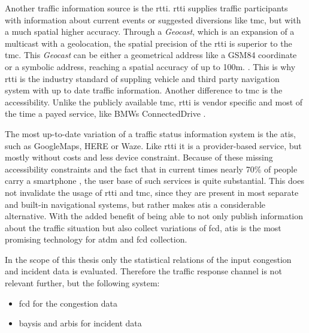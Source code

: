 Another traffic information source is the \acrshort{rtti}. \acrshort{rtti} supplies traffic participants with information about current events or suggested diversions like \acrfull{tmc}, but with a much spatial higher accuracy. Through a \textit{Geocast}, which is an expansion of a multicast with a geolocation, the spatial precision of the \acrshort{rtti} is superior to the \acrshort{tmc}. This \textit{Geocast} can be either a geometrical address like a GSM84 coordinate or a symbolic address, reaching a spatial accuracy of up to 100m.  \parencite{LAPID2020,HindenDeering2006,ImielinskiNavas1996}. This is why \acrshort{rtti} is the industry standard of suppling vehicle and third party navigation system with up to date traffic information. Another difference to \acrshort{tmc} is the accessibility. Unlike the publicly available \acrshort{tmc}, \acrshort{rtti} is vendor specific and most of the time a payed service, like BMWs ConnectedDrive \parencite{BMW2020}. 


The most up-to-date variation of a traffic status information system is the \acrfull{atis}, such as GoogleMaps, HERE or Waze. Like \acrshort{rtti} it is a provider-based service, but mostly without costs and less device constraint. Because of these missing accessibility constraints and the fact that in current times nearly 70\% of people carry a smartphone \parencite{IZM2020}, the user base of such services is quite substantial. This does not invalidate the usage of \acrshort{rtti} and \acrshort{tmc}, since they are present in most separate and built-in navigational systems, but rather makes \acrshort{atis} a considerable alternative. With the added benefit of being able to not only publish information about the traffic situation but also collect variations of \acrshort{fcd}, \acrshort{atis} is the most promising technology for \acrshort{atdm} and \acrshort{fcd} collection. 

\bigskip

\bigskip

\bigskip

In the scope of this thesis only the statistical relations of the input congestion and incident data is evaluated. Therefore the traffic response channel is not relevant further, but the following system: 
\begin{itemize}
  \item \acrshort{fcd} for the congestion data
  \item \acrshort{baysis} and \acrshort{arbis} for incident data
\end{itemize}


